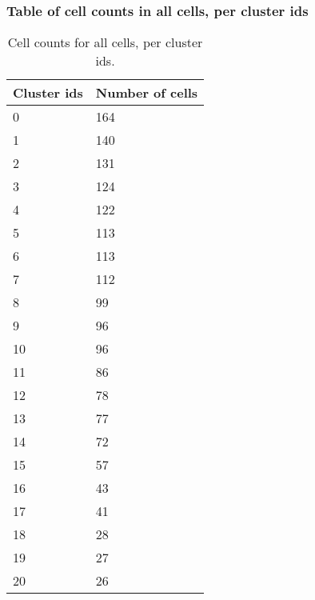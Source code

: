 \subsubsection{Table of cell counts in all cells, per cluster ids}\begin{table}[h]
\centering
\label{my-label}
\begin{tabular}{@{}ll@{}}
\toprule

Cluster ids& Number of cells \\ \midrule
0 & 164 \\

1 & 140 \\

2 & 131 \\

3 & 124 \\

4 & 122 \\

5 & 113 \\

6 & 113 \\

7 & 112 \\

8 & 99 \\

9 & 96 \\

10 & 96 \\

11 & 86 \\

12 & 78 \\

13 & 77 \\

14 & 72 \\

15 & 57 \\

16 & 43 \\

17 & 41 \\

18 & 28 \\

19 & 27 \\

20 & 26 \\
\bottomrule
\end{tabular}
\caption{Cell counts for all cells, per cluster ids.}
\end{table}


